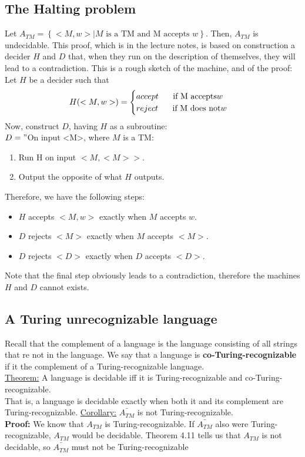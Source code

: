 \documentclass[a4paper]{article}
\begin{document}
\subsection{The Halting problem} %
\label{sub:The Halting problem}
Let $A_{TM}=\left\{ <M,w> | M \text{ is a TM and M accepts }w \right\}$. Then, $A_{TM}$ is undecidable. This proof, which is in the lecture notes, is based on construction a decider $H$ and $D$ that, when they run on the description of themselves, they will lead to a contradiction. This is a rough sketch of the machine, and of the proof:\\
Let $H$ be a decider such that
\begin{align}
  H(<M,w>)=
  \begin{cases}
    accept \hspace{.5 cm} \text{ if M accepts} w \\
    reject \hspace{.5 cm} \text{ if M does not} w \\
  \end{cases}
\end{align}
Now, construct $D$, having $H$ as a subroutine: \\
$D="$On input <M>, where $M$ is a TM:
\begin{enumerate}
  \item Run H on input $<M,<M>>$.
  \item Output the opposite of what $H$ outputs.
\end{enumerate}
Therefore, we have the following steps:
\begin{itemize}
  \item $H$ accepts $<M,w>$ exactly when $M$ accepts $w$.
  \item $D$ rejects $<M>$ exactly when $M$ accepts $<M>$.
  \item $D$ rejects $<D>$ exactly when $D$ accepts $<D>$.
\end{itemize}
Note that the final step obviously leads to a contradiction, therefore the machines $H$ and $D$ cannot exists.
\subsection{A Turing unrecognizable language} %
\label{sub:A turing unrecognizable language}
Recall that the complement of a language is the language consisting of all strings that re not in the language. We say that a language is {\bf co-Turing-recognizable} if it the complement of a Turing-recognizable language.\\
\underline{Theorem:} A language is decidable iff it is Turing-recognizable and co-Turing-recognizable. \\
That is, a language is decidable exactly when both it and its complement are Turing-recognizable.
\underline{Corollary:} $\bar{A_{TM}}$ is not Turing-recognizable. \\
{\bf Proof:} We know that $A_{TM}$ is Turing-recognizable. If $\bar{A_{TM}}$ also were Turing-recognizable, $A_{TM}$ would be decidable. Theorem 4.11 tells us that $A_{TM}$ is not decidable, so $\bar{A_{TM}}$ must not be Turing-recognizable
\end{document}
